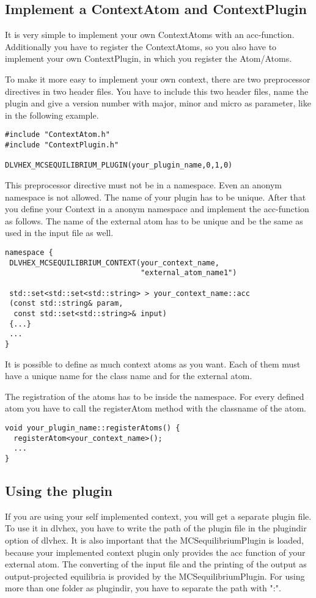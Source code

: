 \documentclass[11pt]{article}
\begin{document}
\subsection{Implement a ContextAtom and ContextPlugin}
It is very simple to implement your own ContextAtoms with an acc-function. Additionally you have to register the ContextAtoms, so you also have to implement your own ContextPlugin, in which you register the Atom/Atoms.

To make it more easy to implement your own context, there are two preprocessor directives in two header files. You have to include this two header files, name the plugin and give a version number with major, minor and micro as parameter, like in the following example.
\lstset{language=C}
\begin{lstlisting}[caption={Implement context plugin},frame=tlrb]
#include "ContextAtom.h"
#include "ContextPlugin.h"

DLVHEX_MCSEQUILIBRIUM_PLUGIN(your_plugin_name,0,1,0)
\end{lstlisting}

This preprocessor directive must not be in a namespace. Even an anonym namespace is not allowed. The name of your plugin has to be unique. After that you define your Context in a anonym namespace and implement the acc-function as follows. The name of the external atom has to be unique and be the same as used in the input file as well.
\lstset{language=C}
\begin{lstlisting}[caption={Implement context atoms},frame=tlrb]
namespace {
 DLVHEX_MCSEQUILIBRIUM_CONTEXT(your_context_name, 
                               "external_atom_name1")

 std::set<std::set<std::string> > your_context_name::acc
 (const std::string& param, 
  const std::set<std::string>& input)
 {...}
 ...
}
\end{lstlisting}
It is possible to define as much context atoms as you want. Each of them must have a unique name for the class name and for the external atom. 

The registration of the atoms has to be inside the namespace. For every defined atom you have to call the registerAtom method with the classname of the atom.
\lstset{language=C}
\begin{lstlisting}[caption={Implement Register Context Atoms},frame=tlrb]
void your_plugin_name::registerAtoms() {
  registerAtom<your_context_name>();
  ...
}
\end{lstlisting}

\subsection{Using the plugin}
If you are using your self implemented context, you will get a separate plugin file. To use it in dlvhex, you have to write the path of the plugin file in the plugindir option of dlvhex. It is also important that the MCSequilibriumPlugin is loaded, because your implemented context plugin only provides the acc function of your external atom. The converting of the input file and the printing of the output as output-projected equilibria is provided by the MCSequilibriumPlugin. For using more than one folder as plugindir, you have to separate the path with ":". 
\end{document}
